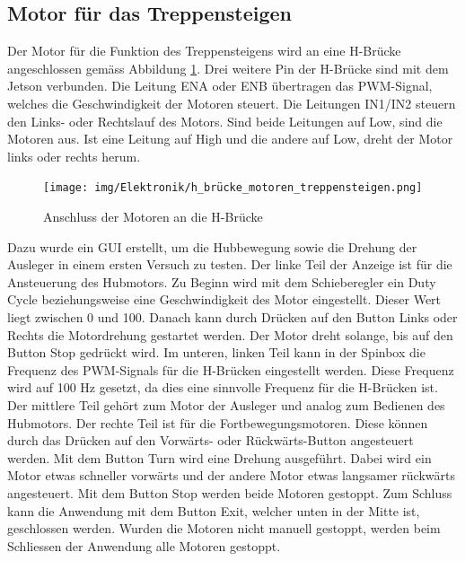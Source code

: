 \subsection{Motor für das Treppensteigen}
Der Motor für die Funktion des Treppensteigens wird an eine H-Brücke angeschlossen gemäss Abbildung \ref{fig:hbrücke-treppe}. Drei weitere Pin der H-Brücke sind mit dem Jetson verbunden. Die Leitung ENA oder ENB übertragen das PWM-Signal, welches die Geschwindigkeit der Motoren steuert. Die Leitungen IN1/IN2 steuern den Links- oder Rechtslauf des Motors. Sind beide Leitungen auf Low, sind die Motoren aus. Ist eine Leitung auf High und die andere auf Low, dreht der Motor links oder rechts herum.

\begin{figure}[H]
  \texttt{[image: img/Elektronik/h\_brücke\_motoren\_treppensteigen.png]}
  \centering
  \caption{Anschluss der Motoren an die H-Brücke}
  \label{fig:hbrücke-treppe}
\end{figure}

\newpage

Dazu wurde ein GUI erstellt, um die Hubbewegung sowie die Drehung der Ausleger in einem ersten Versuch zu testen. Der linke Teil der Anzeige ist für die Ansteuerung des Hubmotors. Zu Beginn wird mit dem Schieberegler ein Duty Cycle beziehungsweise eine Geschwindigkeit des Motor eingestellt. Dieser Wert liegt zwischen 0 und 100. Danach kann durch Drücken auf den Button \glqq Links\grqq{} oder \glqq Rechts\grqq{} die Motordrehung gestartet werden. Der Motor dreht solange, bis auf den Button \glqq Stop\grqq{} gedrückt wird. Im unteren, linken Teil kann in der Spinbox die Frequenz des PWM-Signals für die H-Brücken eingestellt werden. Diese Frequenz wird auf 100 Hz gesetzt, da dies eine sinnvolle Frequenz für die H-Brücken ist. Der mittlere Teil gehört zum Motor der Ausleger und analog zum Bedienen des Hubmotors.
Der rechte Teil ist für die Fortbewegungsmotoren. Diese können durch das Drücken auf den \glqq Vorwärts-\grqq{} oder \glqq Rückwärts\grqq{}-Button angesteuert werden. Mit dem Button \glqq Turn\grqq{} wird eine Drehung ausgeführt. Dabei wird ein Motor etwas schneller vorwärts und der andere Motor etwas langsamer rückwärts angesteuert. Mit dem Button \glqq Stop\grqq{} werden beide Motoren gestoppt. Zum Schluss kann die Anwendung mit dem Button \glqq Exit\grqq{}, welcher unten in der Mitte ist, geschlossen werden. Wurden die Motoren nicht manuell gestoppt, werden beim Schliessen der Anwendung alle Motoren gestoppt.

